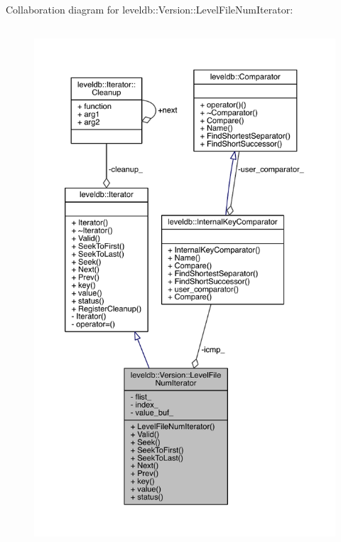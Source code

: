 Collaboration diagram for leveldb\+:\+:Version\+:\+:Level\+File\+Num\+Iterator\+:\nopagebreak
\begin{figure}[H]
\begin{center}
\leavevmode
\includegraphics[height=550pt]{classleveldb_1_1_version_1_1_level_file_num_iterator__coll__graph}
\end{center}
\end{figure}
